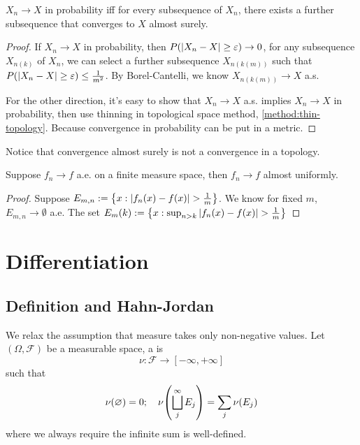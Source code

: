 \begin{thm}
    \(X_{n} \to X\) in probability iff for every subsequence of \(X_{n}\), there exists a further subsequence that converges to \(X\) almost surely. 
\end{thm}
\begin{proof}
    If \(X_{n}\to X\) in probability, then \(P\pqty{\abs{X_{n} - X} \geq \epsilon} \to 0\), for any subsequence \(X_{n(k)}\) of \(X_{n}\), we can select a further subsequence \(X_{n(k(m))}\) such that \(P \pqty{\abs{X_{n} - X} \geq \epsilon} \leq \frac{1}{m^{2}}\). By Borel-Cantelli, we know \(X_{n(k(m))} \to X\) a.s. 

    For the other direction, it's easy to show that \(X_{n} \to X\) a.s. implies \(X_{n}\to X\) in probability, then use thinning in topological space method, \autoref{method:thin-topology}. Because convergence in probability can be put in a metric.
\end{proof}
\begin{remark}
    Notice that convergence almost surely is not a convergence in a topology. 
\end{remark}

\begin{thm}
    Suppose \(f_{n} \to f\) a.e. on a finite measure space, then \(f_{n} \to f\) almost uniformly. 
\end{thm}
\begin{proof}
    Suppose \(E_{m,n} := \Bqty{x: \abs{f_{n}(x) - f(x)} > \frac{1}{m}}\). We know for fixed \(m\), \(E_{m,n} \to \emptyset\) a.e. The set \(E_{m}(k):= \Bqty{x: \sup_{n > k} \abs{f_{n}(x) - f(x)} > \frac{1}{m}} \)  
\end{proof}


\section{Differentiation}

\subsection{Definition and Hahn-Jordan} 

We relax the assumption that measure takes only non-negative values. Let \((\Omega, \mathcal{F})\) be a measurable space, a  is \begin{equation*}
    \nu: \mathcal{F} \to [-\infty,+ \infty]
\end{equation*}
such that 
\begin{equation*}
    \nu\pqty{\emptyset} = 0; \quad \nu\pqty{\bigsqcup_{j}^{\infty} E_{j}} = \sum_{j} \nu\pqty{E_{j}} 
\end{equation*}
where we always require the infinite sum is well-defined. 

